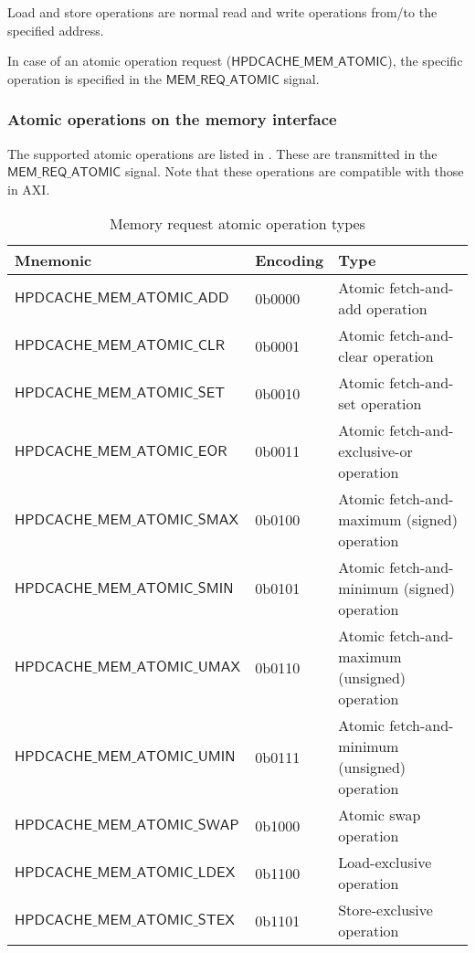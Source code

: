 \documentclass[10pt,titlepage,twoside]{book}
\begin{document}
Load and store operations are normal read and write operations from/to the specified address.

In case of an atomic operation request ($\mathsf{HPDCACHE\_MEM\_ATOMIC}$), the specific operation is specified in the $\mathsf{MEM\_REQ\_ATOMIC}$ signal.


\subsubsection{Atomic operations on the memory interface}

The supported atomic operations are listed in .
These are transmitted in the $\mathsf{MEM\_REQ\_ATOMIC}$ signal.
Note that these operations are compatible with those in AXI.

\begin{table}[h!]
\begin{center}
\caption{Memory request atomic operation types}%
{\footnotesize
\begin{tabular}{lll}
  \toprule
  \textbf{Mnemonic}
  & \textbf{Encoding}
  & \textbf{Type} \\
  \midrule
  $\mathsf{HPDCACHE\_MEM\_ATOMIC\_ADD}$
  & 0b0000
  & Atomic fetch-and-add operation \\
  \midrule
  $\mathsf{HPDCACHE\_MEM\_ATOMIC\_CLR}$
  & 0b0001
  & Atomic fetch-and-clear operation \\
  \midrule
  $\mathsf{HPDCACHE\_MEM\_ATOMIC\_SET}$
  & 0b0010
  & Atomic fetch-and-set operation \\
  \midrule
  $\mathsf{HPDCACHE\_MEM\_ATOMIC\_EOR}$
  & 0b0011
  & Atomic fetch-and-exclusive-or operation \\
  \midrule
  $\mathsf{HPDCACHE\_MEM\_ATOMIC\_SMAX}$
  & 0b0100
  & Atomic fetch-and-maximum (signed) operation \\
  \midrule
  $\mathsf{HPDCACHE\_MEM\_ATOMIC\_SMIN}$
  & 0b0101
  & Atomic fetch-and-minimum (signed) operation \\
  \midrule
  $\mathsf{HPDCACHE\_MEM\_ATOMIC\_UMAX}$
  & 0b0110
  & Atomic fetch-and-maximum (unsigned) operation \\
  \midrule
  $\mathsf{HPDCACHE\_MEM\_ATOMIC\_UMIN}$
  & 0b0111
  & Atomic fetch-and-minimum (unsigned) operation \\
  \midrule
  $\mathsf{HPDCACHE\_MEM\_ATOMIC\_SWAP}$
  & 0b1000
  & Atomic swap operation \\
  \midrule
  $\mathsf{HPDCACHE\_MEM\_ATOMIC\_LDEX}$
  & 0b1100
  & Load-exclusive operation \\
  \midrule
  $\mathsf{HPDCACHE\_MEM\_ATOMIC\_STEX}$
  & 0b1101
  & Store-exclusive operation \\
\end{tabular}}
\end{center}
\end{table}
\end{document}
